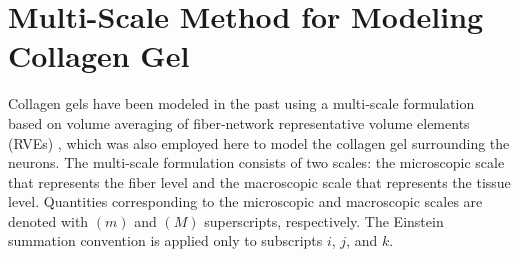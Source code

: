\documentclass[]{interact}
\begin{document}
\section{Multi-Scale Method for Modeling Collagen Gel}
\label{sec:multiscale_method}
Collagen gels have been modeled in the past using a multi-scale formulation based on volume averaging of fiber-network representative volume elements (RVEs) \citep{Chandran:2007hy,Stylianopoulos:2007dp,Barocas:2007gk,Lai:2012ji,Lake:2012jm}, which was also employed here to model the collagen gel surrounding the neurons. The multi-scale formulation consists of two scales: the microscopic scale that represents the fiber level and the macroscopic scale that represents the tissue level. Quantities corresponding to the microscopic and macroscopic scales are denoted with $(m)$ and $(M)$ superscripts, respectively. The Einstein summation convention is applied only to subscripts $i$, $j$, and $k$.
\end{document}
